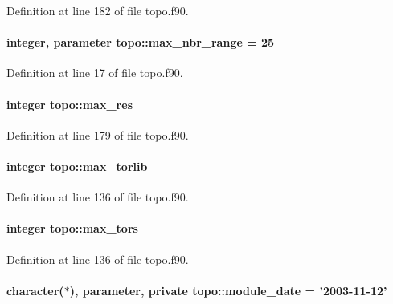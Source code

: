 Definition at line 182 of file topo.\-f90.

\hypertarget{classtopo_a829add9eca19b5542187f422aca77837}{
\paragraph[{max\-\_\-nbr\-\_\-range}]{\setlength{\rightskip}{0pt plus 5cm}integer, parameter topo\-::max\-\_\-nbr\-\_\-range = 25}}\label{classtopo_a829add9eca19b5542187f422aca77837}


Definition at line 17 of file topo.\-f90.

\hypertarget{classtopo_abc8a8c2036ea05a86bfc6e383196e167}{
\paragraph[{max\-\_\-res}]{\setlength{\rightskip}{0pt plus 5cm}integer topo\-::max\-\_\-res}}\label{classtopo_abc8a8c2036ea05a86bfc6e383196e167}


Definition at line 179 of file topo.\-f90.

\hypertarget{classtopo_adb758dbc842950b17c7940a435fd501e}{
\paragraph[{max\-\_\-torlib}]{\setlength{\rightskip}{0pt plus 5cm}integer topo\-::max\-\_\-torlib}}\label{classtopo_adb758dbc842950b17c7940a435fd501e}


Definition at line 136 of file topo.\-f90.

\hypertarget{classtopo_ad15d0e0210d29b89c0da05c40a32f66e}{
\paragraph[{max\-\_\-tors}]{\setlength{\rightskip}{0pt plus 5cm}integer topo\-::max\-\_\-tors}}\label{classtopo_ad15d0e0210d29b89c0da05c40a32f66e}


Definition at line 136 of file topo.\-f90.

\hypertarget{classtopo_a6149f4013048cd71979f0c1733b5a93c}{
\paragraph[{module\-\_\-date}]{\setlength{\rightskip}{0pt plus 5cm}character($\ast$), parameter, private topo\-::module\-\_\-date = '2003-\/11-\/12'\hspace{0.3cm}{\ttfamily [private]}}}\label{classtopo_a6149f4013048cd71979f0c1733b5a93c}



